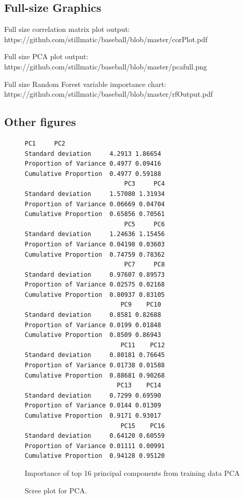 \documentclass[letterpaper, 10 pt, conference]{ieeeconf}
\begin{document}
\subsection{Full-size Graphics}
Full size correlation matrix plot output: https://github.com/stillmatic/baseball/blob/master/corPlot.pdf

Full size PCA plot output: https://github.com/stillmatic/baseball/blob/master/pcafull.png

Full size Random Forest variable importance chart: https://github.com/stillmatic/baseball/blob/master/rfOutput.pdf

\subsection{Other figures}

\begin{figure}[thbp]
\caption{Importance of top 16 principal components from training data PCA}
\begin{Verbatim}[fontsize=\scriptsize, frame=single]
                          PC1     PC2
Standard deviation     4.2913 1.86654
Proportion of Variance 0.4977 0.09416
Cumulative Proportion  0.4977 0.59188
                           PC3     PC4
Standard deviation     1.57080 1.31934
Proportion of Variance 0.06669 0.04704
Cumulative Proportion  0.65856 0.70561
                           PC5     PC6
Standard deviation     1.24636 1.15456
Proportion of Variance 0.04198 0.03603
Cumulative Proportion  0.74759 0.78362
                           PC7     PC8
Standard deviation     0.97607 0.89573
Proportion of Variance 0.02575 0.02168
Cumulative Proportion  0.80937 0.83105
                          PC9    PC10
Standard deviation     0.8581 0.82688
Proportion of Variance 0.0199 0.01848
Cumulative Proportion  0.8509 0.86943
                          PC11    PC12
Standard deviation     0.80181 0.76645
Proportion of Variance 0.01738 0.01588
Cumulative Proportion  0.88681 0.90268
                         PC13    PC14
Standard deviation     0.7299 0.69590
Proportion of Variance 0.0144 0.01309
Cumulative Proportion  0.9171 0.93017
                          PC15    PC16
Standard deviation     0.64120 0.60559
Proportion of Variance 0.01111 0.00991
Cumulative Proportion  0.94128 0.95120
\end{Verbatim}
\end{figure}

\begin{figure}[thpb]
\centering
{}
\caption{Scree plot for PCA.}
\label{figurelabel}
\end{figure}
\end{document}
